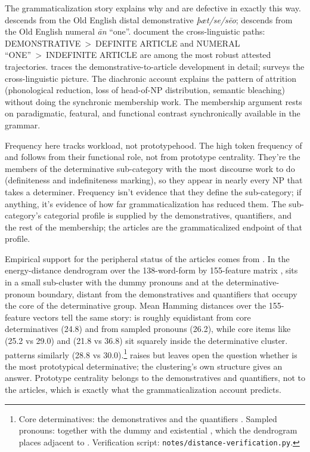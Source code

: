 \documentclass[12pt]{article}
\begin{document}
The grammaticalization story explains why  and  are defective in exactly this way.  descends from the Old English distal demonstrative \textit{þæt/se/sēo};  descends from the Old English numeral \textit{ān} \enquote{one}. \textcite{heinekuteva2002lexicon} document the cross-linguistic paths: DEMONSTRATIVE~>~DEFINITE ARTICLE and NUMERAL \enquote{ONE}~>~INDEFINITE ARTICLE are among the most robust attested trajectories. \textcite{diessel1999} traces the demonstrative-to-article development in detail; \textcite[Ch.~9]{lyons1999} surveys the cross-linguistic picture. The diachronic account explains the pattern of attrition (phonological reduction, loss of head-of-NP distribution, semantic bleaching) without doing the synchronic membership work. The membership argument rests on paradigmatic, featural, and functional contrast synchronically available in the grammar.

Frequency here tracks workload, not prototypehood. The high token frequency of  and  follows from their functional role, not from prototype centrality. They're the members of the determinative sub-category with the most discourse work to do (definiteness and indefiniteness marking), so they appear in nearly every NP that takes a determiner. Frequency isn't evidence that they define the sub-category; if anything, it's evidence of how far grammaticalization has reduced them. The sub-category's categorial profile is supplied by the demonstratives, quantifiers, and the rest of the membership; the articles are the grammaticalized endpoint of that profile.

Empirical support for the peripheral status of the articles comes from \textcite{reynolds2021}. In the energy-distance dendrogram over the 138-word-form by 155-feature matrix \citep{reynolds2021matrix},  sits in a small sub-cluster with the dummy pronouns  and  at the determinative-pronoun boundary, distant from the demonstratives and quantifiers that occupy the core of the determinative group. Mean Hamming distances over the 155-feature vectors tell the same story:  is roughly equidistant from core determinatives (24.8) and from sampled pronouns (26.2), while core items like  (25.2 vs 29.0) and  (21.8 vs 36.8) sit squarely inside the determinative cluster.  patterns similarly (28.8 vs 30.0).\footnote{Core determinatives: the demonstratives  and the quantifiers . Sampled pronouns:  together with the dummy  and existential , which the dendrogram places adjacent to . Verification script: \texttt{notes/distance-verification.py}.} \textcite{reynolds2021} raises but leaves open the question whether  is the most prototypical determinative; the clustering's own structure gives an answer. Prototype centrality belongs to the demonstratives and quantifiers, not to the articles, which is exactly what the grammaticalization account predicts.
\end{document}
